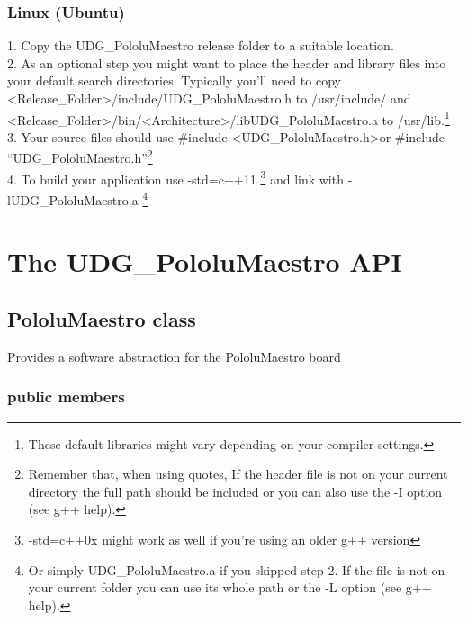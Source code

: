 \documentclass[letterpaper]{book}
\begin{document}
\subsection{Linux (Ubuntu)}
1. Copy the UDG\_PololuMaestro release folder to a suitable location.\\
2. As an optional step you might want to place the header and library files into your default search directories. Typically you'll need to copy \textless{}Release\_Folder\textgreater{}/include/UDG\_PololuMaestro.h to /usr/include/ and \textless{}Release\_Folder\textgreater{}/bin/\textless{}Architecture\textgreater{}/libUDG\_PololuMaestro.a to /usr/lib.\footnote{These default libraries might vary depending on your compiler settings.}\\
3. Your source files should use \#include \textless UDG\_PololuMaestro.h\textgreater or \#include ``UDG\_PololuMaestro.h''\footnote{Remember that, when using quotes, If the header file is not on your current directory the full path should be included or you can also use the -I option (see g++ help).}\\
4. To build your application use -std=c++11 \footnote{ -std=c++0x might work as well if you're using an older g++ version} and link with -lUDG\_PololuMaestro.a \footnote{Or simply UDG\_PololuMaestro.a if you skipped step 2. If the file is not on your current folder you can use its whole path or the -L option (see g++ help).}


\chapter{The UDG\_PololuMaestro API}
\section{PololuMaestro class}
Provides a software abstraction for the PololuMaestro board

\subsection{public members}
\end{document}
